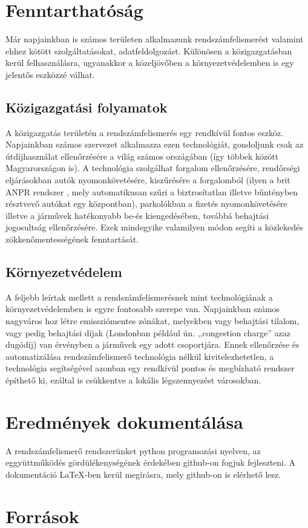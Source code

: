 \documentclass[12pt,a4paper]{article}
\begin{document}
    \section{Fenntarthatóság}

        Már napjainkban is számos területen alkalmazunk rendszámfelismerést valamint ehhez kötött szolgáltatásokat, adatfeldolgozást. Különösen a közigazgatásban kerül felhasználásra, ugyanakkor a közeljövőben a környezetvédelemben is egy jelentős eszközzé válhat.
        \subsection{Közigazgatási folyamatok}
            A közigazgatás területén a rendszámfelismerés egy rendkívül fontos eszköz. Napjainkban számos szervezet alkalmazza ezen technológiát, gondoljunk csak az útdíjhasználat ellenőrzésére a világ számos országában (így többek között Magyarországon is). A technológia szolgálhat forgalom ellenőrzésére, rendőrségi eljárásokban autók nyomonkövetésére, kiszűrésére a forgalomból (ilyen a brit ANPR rendszer \cite{police_uk}, mely automatikusan szűri a biztrosítatlan illetve bűntényben résztvevő autókat egy központban), parkolókban a fizetés nyomonkövetésére illetve a járművek hatékonyabb be-és kiengedésében, továbbá behajtási jogosultság ellenőrzésére. Ezek mindegyike valamilyen módon segíti a közlekedés zökkenőmentességének fenntartását.

        \subsection{Környezetvédelem}
            A feljebb leírtak mellett a rendszámfelismerésnek mint technológiának a környezetvédelemben is egyre fontosabb szerepe van. Napjainkban számos nagyváros hoz létre emissziómentes zónákat, melyekben vagy behajtási tilalom, vagy pedig behajtási díjak (Londonban például ún. ,,congestion charge'' azaz dugódíj) van érvényben a járművek egy adott csoportjára. Ennek ellenőrzése és automatizálása rendszámfelismerő technológia nélkül kivitelezhetetlen, a technológia segítségével azonban egy rendkívül pontos és megbízható rendszer építhető ki, ezáltal is csükkentve a lokális légszennyezést városokban.

    \section{Eredmények dokumentálása}
        A rendszámfelismerő rendszerünket python programozási nyelven, az eggyüttműködés gördülékenységének érdekében github-on fogjuk fejleszteni. A dokumentáció \LaTeX-ben kerül megírásra, mely github-on is elérhető lesz.
    \newpage
    \section{Források}
    
    
        
\end{document}
